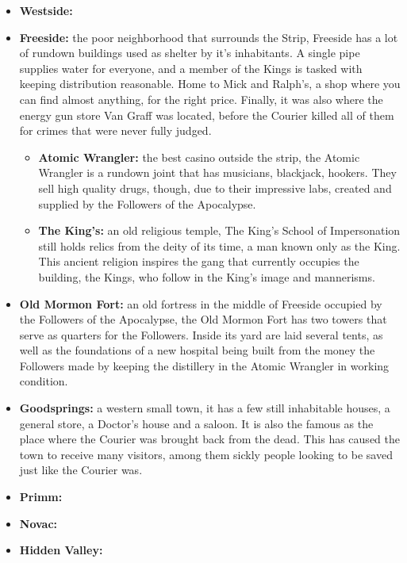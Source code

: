 \documentclass[11pt]{article} %
\begin{document}
\begin{itemize}
	\item \textbf{Westside:}
	
	\item \textbf{Freeside:} the poor neighborhood that surrounds the Strip, Freeside has a lot of rundown buildings used as shelter by it's inhabitants. A single pipe supplies water for everyone, and a member of the Kings is tasked with keeping distribution reasonable. Home to Mick and Ralph's, a shop where you can find almost anything, for the right price. Finally, it was also where the energy gun store Van Graff was located, before the Courier killed all of them for crimes that were never fully judged.
	\begin{itemize}
		\item \textbf{Atomic Wrangler:} the best casino outside the strip, the Atomic Wrangler is a rundown joint that has musicians, blackjack, hookers. They sell high quality drugs, though, due to their impressive labs, created and supplied by the Followers of the Apocalypse.
		\item \textbf{The King's:} an old religious temple, The King's School of Impersonation still holds relics from the deity of its time, a man known only as the King. This ancient religion inspires the gang that currently occupies the building, the Kings, who follow in the King's image and mannerisms.
	\end{itemize}

	\item \textbf{Old Mormon Fort:} an old fortress in the middle of Freeside occupied by the Followers of the Apocalypse, the Old Mormon Fort has two towers that serve as quarters for the Followers. Inside its yard are laid several tents, as well as the foundations of a new hospital being built from the money the Followers made by keeping the distillery in the Atomic Wrangler in working condition.
	
	\item \textbf{Goodsprings:} a western small town, it has a few still inhabitable houses, a general store, a Doctor's house and a saloon. It is also the famous as the place where the Courier was brought back from the dead. This has caused the town to receive many visitors, among them sickly people looking to be saved just like the Courier was.
	
	\item \textbf{Primm:} 
	
	\item \textbf{Novac:}
	
	\item \textbf{Hidden Valley:}
	

\end{itemize}
\end{document}
